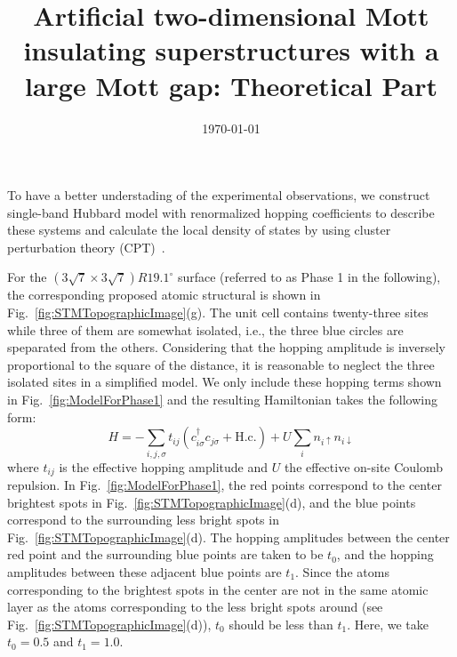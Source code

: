 \documentclass[aps,prb,amsfonts,amsmath,amssymb,showpacs,groupedaddress,superscriptaddress]{revtex4-1}
\begin{document}
\title{Artificial two-dimensional Mott insulating superstructures with a large Mott gap: Theoretical Part}

\date{\today}

\maketitle

To have a better understading of the experimental observations, we construct single-band Hubbard model with renormalized hopping coefficients to describe these systems and calculate the local density of states by using cluster perturbation theory (CPT)~\cite{PhysRevB.48.418,PhysRevLett.84.522}.

For the $(3\sqrt{7} \times 3\sqrt{7})R19.1^\circ$ surface (referred to as Phase 1 in the following), the corresponding proposed atomic structural is shown in Fig.~\ref{fig:STMTopographicImage}(g). The unit cell contains twenty-three sites while three of them are somewhat isolated, i.e., the three blue circles are speparated from the others. Considering that the hopping amplitude is inversely proportional to the square of the distance, it is reasonable to neglect the three isolated sites in a simplified model. We only include these hopping terms shown in Fig.~\ref{fig:ModelForPhase1} and the resulting Hamiltonian takes the following form:
\begin{equation}
    H = -\sum_{i,j,\sigma} t_{ij}(c_{i\sigma}^{\dagger}c_{j\sigma} + \text{H.c.}) + U \sum_{i} n_{i\uparrow} n_{i\downarrow}
    \label{eq:ModelHamiltonian}
\end{equation}
where $t_{ij}$ is the effective hopping amplitude and $U$ the effective on-site Coulomb repulsion. In Fig.~\ref{fig:ModelForPhase1}, the red points correspond to the center brightest spots in Fig.~\ref{fig:STMTopographicImage}(d), and the blue points correspond to the surrounding less bright spots in Fig.~\ref{fig:STMTopographicImage}(d). The hopping amplitudes between the center red point and the surrounding blue points are taken to be $t_0$, and the hopping amplitudes between these adjacent blue points are $t_1$. Since the atoms corresponding to the brightest spots in the center are not in the same atomic layer as the atoms corresponding to the less bright spots around (see Fig.~\ref{fig:STMTopographicImage}(d)), $t_0$ should be less than $t_1$. Here, we take $t_0 = 0.5$ and $t_1 = 1.0$.
\end{document}
